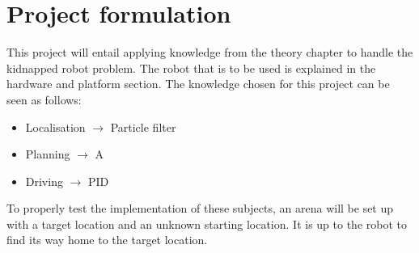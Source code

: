 \section{Project formulation}
This project will entail applying knowledge from the theory chapter to handle the kidnapped robot problem. The robot that is to be used is explained in the hardware and platform section. The knowledge chosen for this project can be seen as follows:
\begin{itemize}
\item Localisation $\rightarrow$ Particle filter
\item Planning $\rightarrow$ A\*
\item Driving $\rightarrow$ PID
\end{itemize}
To properly test the implementation of these subjects, an arena will be set up with a target location and an unknown starting location. It is up to the robot to find its way home to the target location.

